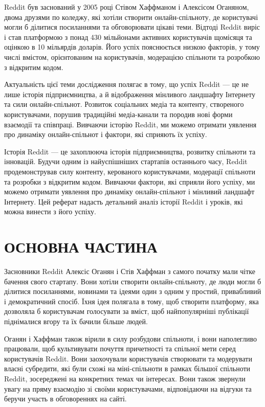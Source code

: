 \documentclass[oneside,14pt]{extarticle}
\begin{document}
Reddit був заснований у 2005 році Стівом Хаффманом і Алексісом Оганяном, двома друзями по коледжу, які хотіли створити онлайн-спільноту, де користувачі могли б ділитися посиланнями та обговорювати цікаві теми. Відтоді Reddit виріс і став платформою з понад 430 мільйонами активних користувачів щомісяця та оцінкою в 10 мільярдів доларів. Його успіх пояснюється низкою факторів, у тому числі вмістом, орієнтованим на користувачів, модерацією спільноти та розробкою з відкритим кодом.

Актуальність цієї теми дослідження полягає в тому, що успіх Reddit — це не лише історія підприємництва, а й відображення мінливого ландшафту Інтернету та сили онлайн-спільнот. Розвиток соціальних медіа та контенту, створеного користувачами, порушив традиційні медіа-канали та породив нові форми взаємодії та співпраці. Вивчаючи історію Reddit, ми можемо отримати уявлення про динаміку онлайн-спільнот і фактори, які сприяють їх успіху.

Історія Reddit — це захоплююча історія підприємництва, розвитку спільноти та інновацій. Будучи одним із найуспішніших стартапів останнього часу, Reddit продемонстрував силу контенту, керованого користувачами, модерації спільноти та розробки з відкритим кодом. Вивчаючи фактори, які сприяли його успіху, ми можемо отримати уявлення про динаміку онлайн-спільнот і мінливий ландшафт Інтернету. Цей реферат надасть детальний аналіз історії Reddit і уроків, які можна винести з його успіху.

\section*{ОСНОВНА ЧАСТИНА}

Засновники Reddit Алексіс Оганян і Стів Хаффман з самого початку мали чітке бачення свого стартапу. Вони хотіли створити онлайн-спільноту, де люди могли б ділитися посиланнями, новинами та ідеями один з одним у простий, привабливий і демократичний спосіб. Їхня ідея полягала в тому, щоб створити платформу, яка дозволяла б користувачам голосувати за вміст, щоб найпопулярніші публікації піднімалися вгору та їх бачили більше людей.

Оганян і Хаффман також вірили в силу розбудови спільноти, і вони наполегливо працювали, щоб культивувати почуття причетності та спільної мети серед користувачів Reddit. Вони заохочували користувачів створювати та модерувати власні субредити, які були схожі на міні-спільноти в рамках більшої спільноти Reddit, зосереджені на конкретних темах чи інтересах. Вони також звернули увагу на пряму взаємодію зі своїми користувачами, відповідаючи на відгуки та беручи участь в обговореннях на сайті.
\end{document}
